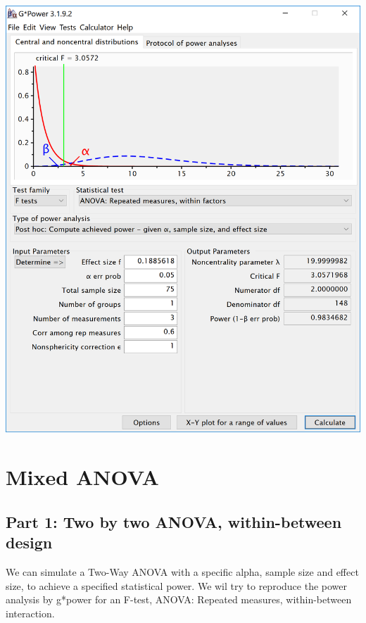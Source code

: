 \documentclass[]{book}
\begin{document}
\includegraphics{screenshots/gpower_4.png}

\hypertarget{mixed-anova}{%
\chapter{Mixed ANOVA}\label{mixed-anova}}

\hypertarget{part-1-two-by-two-anova-within-between-design}{%
\section{Part 1: Two by two ANOVA, within-between design}\label{part-1-two-by-two-anova-within-between-design}}

We can simulate a Two-Way ANOVA with a specific alpha, sample size and effect size, to achieve a specified statistical power. We wil try to reproduce the power analysis by g*power for an F-test, ANOVA: Repeated measures, within-between interaction.
\end{document}

